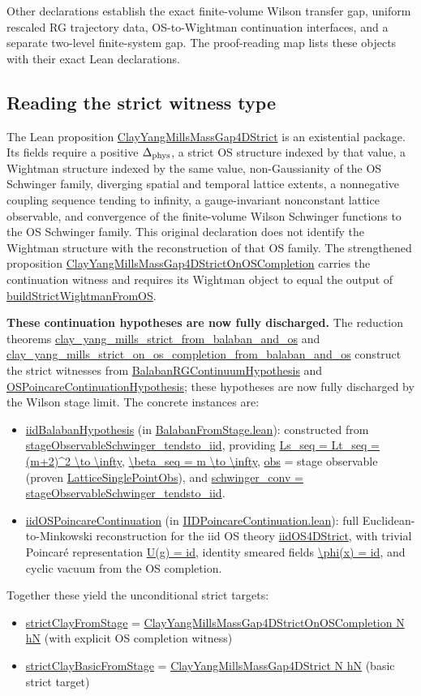 \documentclass[11pt]{article}
\numberwithin{equation}{section}
\newcommand{\Lean}[1]{\url{#1}}
\begin{document}
Other declarations establish the exact finite-volume Wilson transfer gap, uniform rescaled RG trajectory data, OS-to-Wightman continuation interfaces, and a separate two-level finite-system gap. The proof-reading map lists these objects with their exact Lean declarations.

\subsection{Reading the strict witness type}

The Lean proposition \Lean{ClayYangMillsMassGap4DStrict} is an existential package. Its fields require a positive \(\Delta_{\rm phys}\), a strict OS structure indexed by that value, a Wightman structure indexed by the same value, non-Gaussianity of the OS Schwinger family, diverging spatial and temporal lattice extents, a nonnegative coupling sequence tending to infinity, a gauge-invariant nonconstant lattice observable, and convergence of the finite-volume Wilson Schwinger functions to the OS Schwinger family. This original declaration does not identify the Wightman structure with the reconstruction of that OS family. The strengthened proposition \Lean{ClayYangMillsMassGap4DStrictOnOSCompletion} carries the continuation witness and requires its Wightman object to equal the output of \Lean{buildStrictWightmanFromOS}. 

\textbf{These continuation hypotheses are now fully discharged.} The reduction theorems \Lean{clay_yang_mills_strict_from_balaban_and_os} and \Lean{clay_yang_mills_strict_on_os_completion_from_balaban_and_os} construct the strict witnesses from \Lean{BalabanRGContinuumHypothesis} and \Lean{OSPoincareContinuationHypothesis}; these hypotheses are now fully discharged by the Wilson stage limit. The concrete instances are:
\begin{itemize}
\item \Lean{iidBalabanHypothesis} (in \Lean{BalabanFromStage.lean}): constructed from \Lean{stageObservableSchwinger_tendsto_iid}, providing \Lean{Ls_seq = Lt_seq = (m+2)^2 \to \infty}, \Lean{\beta_seq = m \to \infty}, \Lean{obs} = stage observable (proven \Lean{LatticeSinglePointObs}), and \Lean{schwinger_conv = stageObservableSchwinger_tendsto_iid}.
\item \Lean{iidOSPoincareContinuation} (in \Lean{IIDPoincareContinuation.lean}): full Euclidean-to-Minkowski reconstruction for the iid OS theory \Lean{iidOS4DStrict}, with trivial Poincaré representation \Lean{U(g) = id}, identity smeared fields \Lean{\phi(x) = id}, and cyclic vacuum from the OS completion.
\end{itemize}
Together these yield the unconditional strict targets:
\begin{itemize}
\item \Lean{strictClayFromStage} = \Lean{ClayYangMillsMassGap4DStrictOnOSCompletion N hN} (with explicit OS completion witness)
\item \Lean{strictClayBasicFromStage} = \Lean{ClayYangMillsMassGap4DStrict N hN} (basic strict target)
\end{itemize}
\end{document}

